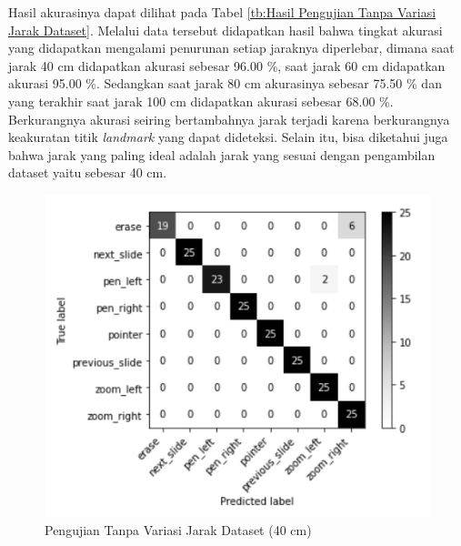 Hasil akurasinya dapat dilihat pada Tabel \ref{tb:Hasil Pengujian Tanpa Variasi Jarak Dataset}. Melalui data tersebut didapatkan hasil bahwa tingkat akurasi yang didapatkan mengalami penurunan setiap jaraknya diperlebar, dimana saat jarak 40 cm didapatkan akurasi sebesar 96.00 \%, saat jarak 60 cm didapatkan akurasi 95.00 \%. Sedangkan saat jarak 80 cm akurasinya sebesar 75.50 \% dan yang terakhir saat jarak 100 cm didapatkan akurasi sebesar 68.00 \%. Berkurangnya akurasi seiring bertambahnya jarak terjadi karena berkurangnya keakuratan titik \emph{landmark} yang dapat dideteksi. Selain itu, bisa diketahui juga bahwa jarak yang paling ideal adalah jarak yang sesuai dengan pengambilan dataset yaitu sebesar 40 cm.

\begin{figure}[!htb]
  \centering
  \includegraphics[scale=0.79]{gambar/pengujian-jarak/homogen-dataset/40cm.png}
  \caption{Pengujian Tanpa Variasi Jarak Dataset (40 cm)}
  \label{fig:Pengujian Tanpa Variasi Jarak Dataset (40 cm)}
\end{figure}

